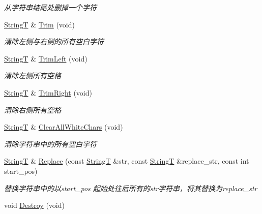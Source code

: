 \begin{DoxyCompactItemize}
\begin{DoxyCompactList}\small\item\em 从字符串结尾处删掉一个字符 \end{DoxyCompactList}\item 
\hyperlink{class_util_1_1_string_t}{String\-T} \& \hyperlink{class_util_1_1_string_t_a5e61c607c9c1077e159bf37f070eacfe}{Trim} (void)
\begin{DoxyCompactList}\small\item\em 清除左侧与右侧的所有空白字符 \end{DoxyCompactList}\item 
\hyperlink{class_util_1_1_string_t}{String\-T} \& \hyperlink{class_util_1_1_string_t_a56417db03430eaf3c89469788e63dc00}{Trim\-Left} (void)
\begin{DoxyCompactList}\small\item\em 清除左侧所有空格 \end{DoxyCompactList}\item 
\hyperlink{class_util_1_1_string_t}{String\-T} \& \hyperlink{class_util_1_1_string_t_a72eade948c17f6d14589bb7b83f0733f}{Trim\-Right} (void)
\begin{DoxyCompactList}\small\item\em 清除右侧所有空格 \end{DoxyCompactList}\item 
\hyperlink{class_util_1_1_string_t}{String\-T} \& \hyperlink{class_util_1_1_string_t_a38e0dcc53f8ac3fac063df7ff9f6143d}{Clear\-All\-White\-Chars} (void)
\begin{DoxyCompactList}\small\item\em 清除字符串中的所有空白字符 \end{DoxyCompactList}\item 
\hyperlink{class_util_1_1_string_t}{String\-T} \& \hyperlink{class_util_1_1_string_t_a7f6eac1dcecad979da09b67da2c33d3c}{Replace} (const \hyperlink{class_util_1_1_string_t}{String\-T} \&str, const \hyperlink{class_util_1_1_string_t}{String\-T} \&replace\-\_\-str, const int start\-\_\-pos)
\begin{DoxyCompactList}\small\item\em 替换字符串中的以start\-\_\-pos 起始处往后所有的str字符串，将其替换为replace\-\_\-str \end{DoxyCompactList}\item 
\hypertarget{class_util_1_1_string_t_a128a238a99785dc286e51650712b51b6}{void \hyperlink{class_util_1_1_string_t_a128a238a99785dc286e51650712b51b6}{Destroy} (void)}\label{class_util_1_1_string_t_a128a238a99785dc286e51650712b51b6}


\end{DoxyCompactItemize}
